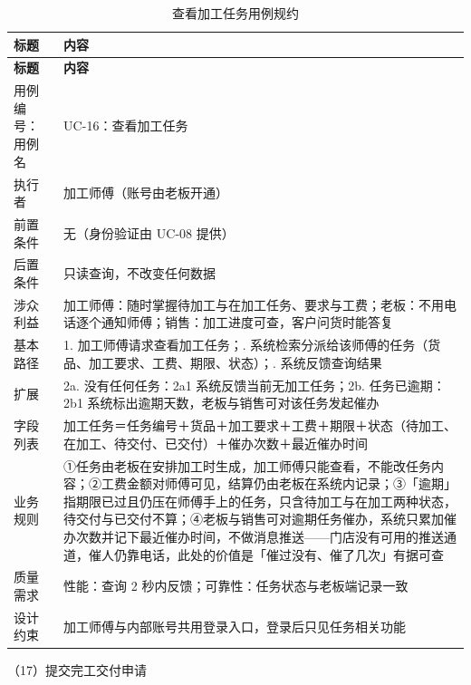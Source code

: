 {\small
\begin{longtable}{@{}L{3.0cm} L{12.3cm}@{}}
\caption{查看加工任务用例规约}\label{tab:uc-16}\\
\toprule
\textbf{标题} & \textbf{内容} \\
\midrule
\endfirsthead
\toprule
\textbf{标题} & \textbf{内容} \\
\midrule
\endhead
用例编号：用例名 & UC-16：查看加工任务 \\
\midrule
执行者 & 加工师傅（账号由老板开通） \\
\midrule
前置条件 & 无（身份验证由 UC-08 提供） \\
\midrule
后置条件 & 只读查询，不改变任何数据 \\
\midrule
涉众利益 & 加工师傅：随时掌握待加工与在加工任务、要求与工费；\newline 老板：不用电话逐个通知师傅；\newline 销售：加工进度可查，客户问货时能答复 \\
\midrule
基本路径 & 1. 加工师傅请求查看加工任务；. 系统检索分派给该师傅的任务（货品、加工要求、工费、期限、状态）；. 系统反馈查询结果 \\
\midrule
扩展 & 2a. 没有任何任务：2a1 系统反馈当前无加工任务；\newline 2b. 任务已逾期：2b1 系统标出逾期天数，老板与销售可对该任务发起催办 \\
\midrule
字段列表 & 加工任务＝任务编号＋货品＋加工要求＋工费＋期限＋状态（待加工、在加工、待交付、已交付）＋催办次数＋最近催办时间 \\
\midrule
业务规则 & ①任务由老板在安排加工时生成，加工师傅只能查看，不能改任务内容；\newline ②工费金额对师傅可见，结算仍由老板在系统内记录；\newline ③「逾期」指期限已过且仍压在师傅手上的任务，只含待加工与在加工两种状态，待交付与已交付不算；\newline ④老板与销售可对逾期任务催办，系统只累加催办次数并记下最近催办时间，不做消息推送——门店没有可用的推送通道，催人仍靠电话，此处的价值是「催过没有、催了几次」有据可查 \\
\midrule
质量需求 & 性能：查询 2 秒内反馈；\newline 可靠性：任务状态与老板端记录一致 \\
\midrule
设计约束 & 加工师傅与内部账号共用登录入口，登录后只见任务相关功能 \\
\midrule
\bottomrule
\end{longtable}}
\noindent（17）提交完工交付申请

